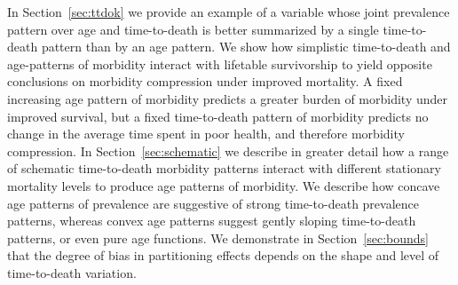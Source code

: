 \documentclass[12pt,oneside,a4paper]{article} %
\begin{document}
In Section~\ref{sec:ttdok} we provide an example of a variable whose joint prevalence pattern over age and time-to-death is better summarized by a single time-to-death pattern than by an age pattern. We show how simplistic time-to-death and age-patterns of morbidity interact with lifetable survivorship to yield opposite conclusions on morbidity compression under improved mortality. A fixed increasing age pattern of morbidity predicts a greater burden of morbidity under improved survival, but a fixed time-to-death pattern of morbidity predicts no change in the average time spent in poor health, and therefore morbidity compression. In Section~\ref{sec:schematic} we describe in greater detail how a range of schematic time-to-death morbidity patterns interact with different stationary mortality levels to produce age patterns of morbidity. We describe how concave age patterns of prevalence are suggestive of strong time-to-death prevalence patterns, whereas convex age patterns suggest gently sloping time-to-death patterns, or even pure age functions.  We demonstrate in Section~\ref{sec:bounds} that the degree of bias in partitioning effects depends on the shape and level of time-to-death variation. 



\newpage%


\end{document}
